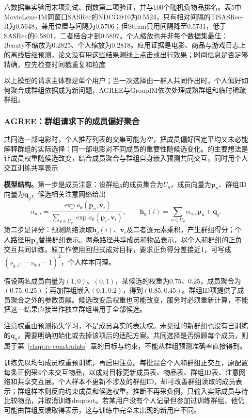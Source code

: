 六数据集实验用末项测试、倒数第二项验证，并与100个随机负物品排名。表5中MovieLens-1M同窗口SASRec的NDCG@10为0.5524，只有相对间隔的TiSASRec-R为0.5648，兼用位置与间隔为0.5706；但Steam只用间隔降至0.5731，低于SASRec的0.5801，二者结合才到0.5897。个人缩放也并非每个数据集最佳：Beauty不缩放为0.2825、个人缩放为0.2818。应用证据是电影、商品与游戏日志上的离线后继预测，论文没有用这些结果测线上点击或出行效果；时间信息是否足够精确，应先检查时间戳重复和粒度

以上模型的请求主体都是单个用户；当一次选择由一群人共同作出时，个人偏好如何聚合成群组依据成为新问题，AGREE与GroupIM依次处理成熟群组和临时稀疏群组。
\subsubsection{AGREE：群组请求下的成员偏好聚合}
\label{sec:rs-agree}

共同选一部电影时，个人推荐列表的交集可能为空，把成员偏好固定平均又未必能解释群组的实际选择：同一部电影对不同成员的重要性随候选变化。的主要想法是让成员权重随候选改变，结合成员聚合与群组自身嵌入预测共同交互，同时用个人交互训练共享表示

\textbf{模型结构。}第一步是成员注意：设群组$g$的成员集合为$U_g$，成员向量为$\bm{p}_u$、群组ID向量为$\bm{q}_g$，候选相关注意网络给出
\begin{equation}
  \alpha_{u,i}=
   \frac{\exp a_\theta(\bm{p}_u,\bm{v}_i)}
        {\sum_{v\in U_g}\exp a_\theta(\bm{p}_v,\bm{v}_i)},\qquad
  \bm{h}_g(i)=\sum_{u\in U_g}\alpha_{u,i}\bm{p}_u+\bm{q}_g.
  \label{eq:rs-agree}
\end{equation}
第二步是评分：预测网络读取$\bm{h}_g(i)$、$\bm{v}_i$及二者逐元素乘积，产生群组得分；个人路径用$\bm{p}_u$替换群组表示。两条路径共享成员和物品表示，以个人和群组的正负交互共同训练。原工作使用回归式成对目标，要求正负得分差接近1，可写成$(s_{g,i^+}-s_{g,j}-1)^2$，个人样本同理。

假设两名成员向量为$(1,0)$、$(0,1)$，某候选的权重为0.75、0.25，成员聚合为$(0.75,0.25)$；再加群组嵌入$(0.1,0.2)$，得到$(0.85,0.45)$。群组ID项提供了成员聚合之外的参数贡献。候选改变后权重也可能改变，服务时必须重新计算，不能把这一结果直接当作独立群组塔用于全部候选。

注意权重由预测损失学习，不是成员真实的表决权。未见过的新群组也没有已训练的$\bm{q}_g$，需要明确初始化或去掉该项后的适配方案。共同选择是否照顾每个成员，则属于第~\ref{chap:rs-constraints}~章的目标与约束，不能从群组预测准确率直接得到。

训练先以均匀成员权重预训练，再启用注意。每批混合个人和群组正交互，原配置每条正例采4个未交互物品，以成对目标更新成员表、物品表、群组ID表、注意网络和共享交互层。个人样本不更新不涉及的群组ID，却可改善群组读取的成员表示；群组样本则反向约束成员和候选权重。推断不再采负例，只输入实际成员与待比较物品，并取消训练dropout。若某用户没有个人记录但参加过训练群组，他仍可能由群组反馈取得表示，这与训练中完全未出现的新用户不同。

